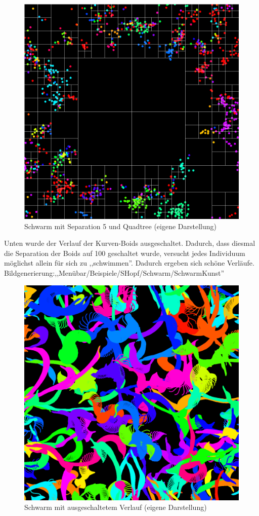 \documentclass[../mciAusarbeitung.tex]{subfiles}
\begin{document}
		\begin{figure}[H]
			\centering
			\includegraphics[width=0.5\linewidth]{img/schwarmQuad.png}
			\caption[SchwarmQuad]{Schwarm mit Separation 5 und Quadtree (eigene Darstellung)}
		\end{figure}
		\noindent Unten wurde der Verlauf der Kurven-Boids ausgeschaltet. Dadurch, dass diesmal die Separation der Boids auf 100 geschaltet wurde, versucht jedes Individuum möglichst allein für sich zu ,,schwimmen''. Dadurch ergeben sich schöne Verläufe.\\
		Bildgenerierung:,,Menübar/Beispiele/SHopf/Schwarm/SchwarmKunst''\\
		\begin{figure}[H]
			\centering
			\includegraphics[width=0.5\linewidth]{img/schwarmKunst.png}
			\caption[SchwarmKunst]{Schwarm mit ausgeschaltetem Verlauf (eigene Darstellung)}
		\end{figure}
		
		
\end{document}
